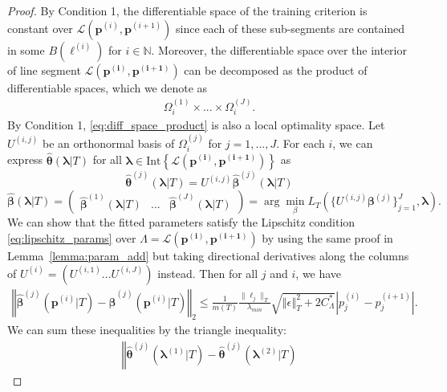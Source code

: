 \documentclass[10pt]{book}
\theoremstyle{definition}
\begin{document}
\begin{proof}
	By Condition 1, the differentiable space of the training criterion
	is constant over $\mathcal{L}\left(\boldsymbol{p}^{(i)},\boldsymbol{p}^{(i+1)}\right)$
	since each of these sub-segments are contained in some $B(\boldsymbol{\ell}^{(i)})$
	for $i\in\mathbb{N}$.
	Moreover, the differentiable space over the interior of line segment $\mathcal{L}\left(\boldsymbol{p^{(i)},p^{(i+1)}}\right)$ can be decomposed as the product of differentiable spaces, which we denote as
	\begin{align}
	\Omega_{i}^{(1)} \times ... \times \Omega_{i}^{(J)}.
	\label{eq:diff_space_product}
	\end{align}
	By Condition 1, \eqref{eq:diff_space_product} is also a local optimality space.
	Let $U^{(i,j)}$ be an orthonormal basis of $\Omega_{i}^{(j)}$ for $j = 1,...,J$.
	For each $i$, we can express $\hat{\boldsymbol{\theta}}(\boldsymbol{\lambda}|T)$
	for all $\boldsymbol{\lambda}\in\mbox{Int}\left\{ \mathcal{L}\left(\boldsymbol{p^{(i)},p^{(i+1)}}\right)\right\} $
	as 
	\[
	\hat{\boldsymbol{\theta}}^{(j)}(\boldsymbol{\lambda}|T)
	=U^{(i,j)}\hat{\boldsymbol{\beta}}^{(j)}(\boldsymbol{\lambda}|T)
	\]
	\[
	\hat{\boldsymbol{\beta}}(\boldsymbol{\lambda}|T)
	= \left (
	\begin{matrix}
	\hat{\boldsymbol{\beta}}^{(1)}(\boldsymbol{\lambda}|T)
	& ... &
	\hat{\boldsymbol{\beta}}^{(J)}(\boldsymbol{\lambda}|T)
	\end{matrix}
	\right )
	=\arg\min_{\beta}L_{T}
	\left (
	\{U^{(i,j)}\boldsymbol{\beta}^{(j)} \}_{j=1}^J,
	\boldsymbol{\lambda}
	\right ).
	\]
	We can show that the fitted parameters satisfy the Lipschitz condition \eqref{eq:lipschitz_params} over $\Lambda=\mathcal{L}\left(\boldsymbol{p^{(i)},p^{(i+1)}}\right)$ by using the same proof in Lemma~\ref{lemma:param_add} but taking directional derivatives along the columns of $U^{(i)} = (U^{(i,1)} ... U^{(i,J)})$ instead.
	Then for all $j$ and $i$, we have
	\begin{align}
	\left\Vert
	\boldsymbol{\hat{\beta}}^{(j)}(\boldsymbol{p}^{(i)}|T)
	-\boldsymbol{\hat{\beta}}^{(j)}(\boldsymbol{p}^{(i)}|T)
	\right\Vert _{2}
	\le
	\frac{1}{m(T)} \frac{\|\ell_j\|_T}{\lambda_{min}}
	\sqrt{\left\Vert \epsilon \right \Vert_T^2 + 2 C^*_{\Lambda}}
	\left |p^{(i)}_j-p^{(i+1)}_j\right |.
	\end{align}
	We can sum these inequalities by the triangle inequality:
	\begin{align*}
	\left\Vert
	\hat{\boldsymbol{\theta}}^{(j)}(\boldsymbol{\lambda}^{(1)}|T)
	-\hat{\boldsymbol{\theta}}^{(j)}(\boldsymbol{\lambda}^{(2)}|T)

\end{align*}
\end{proof}
\end{document}
